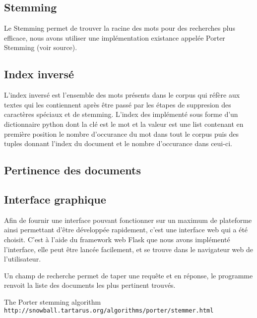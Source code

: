 \documentclass[11pt]{article}
\begin{document}
\subsection{Stemming}
Le Stemming permet de trouver la racine des mots pour des recherches plus efficace, nous avons utiliser une implémentation existance appelée Porter Stemming (voir source).

\subsection{Index inversé}
L'index inversé est l'ensemble des mots présents dans le corpus qui réfère aux textes qui les contiennent après être passé par les étapes de suppresion des caractères spéciaux et de stemming.
L'index des implémenté sous forme d'un dictionnaire python dont la clé est le mot et la valeur est une list contenant en première position le nombre d'occurance du mot dans tout le corpus puis des tuples donnant l'index du document et le nombre d'occurance dans ceui-ci.

\subsection{Pertinence des documents}


\subsection{Interface graphique}
Afin de fournir une interface pouvant fonctionner sur un maximum de plateforme ainsi permettant d'être développée rapidement, c'est une interface web qui a été choisit.
C'est à l'aide du framework web Flask que nous avons implémenté l'interface, elle peut être lancée facilement, et se trouve dans le navigateur web de l'utilisateur.

Un champ de recherche permet de taper une requête et en réponse, le programme renvoit la liste des documents les plus pertinent trouvés. 

\pagebreak

\begin{thebibliography}{9}

    The Porter stemming algorithm
    \\\texttt{http://snowball.tartarus.org/algorithms/porter/stemmer.html}

\end{thebibliography}
\end{document}
